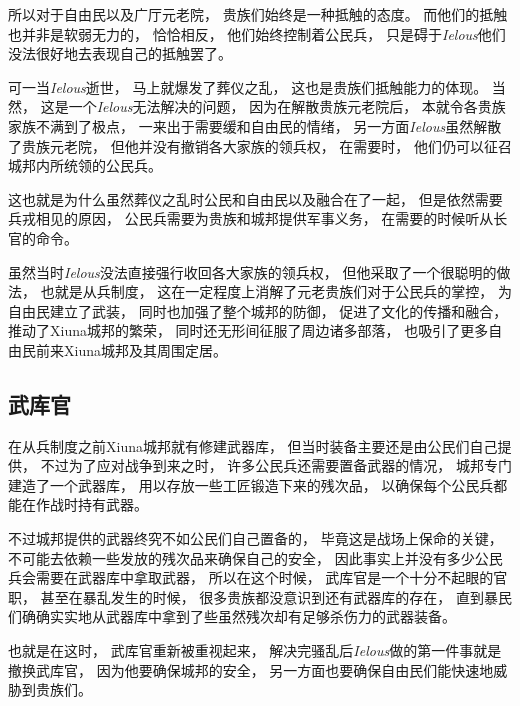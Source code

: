 \documentclass[12pt, a4paper]{ctexart}
\begin{document}
        所以对于自由民以及广厅元老院，
        贵族们始终是一种抵触的态度。
        而他们的抵触也并非是软弱无力的，
        恰恰相反，
        他们始终控制着公民兵，
        只是碍于\emph{Ielous}他们没法很好地去表现自己的抵触罢了。

        可一当\emph{Ielous}逝世，
        马上就爆发了葬仪之乱，
        这也是贵族们抵触能力的体现。
        当然，
        这是一个\emph{Ielous}无法解决的问题，
        因为在解散贵族元老院后，
        本就令各贵族家族不满到了极点，
        一来出于需要缓和自由民的情绪，
        另一方面\emph{Ielous}虽然解散了贵族元老院，
        但他并没有撤销各大家族的领兵权，
        在需要时，
        他们仍可以征召城邦内所统领的公民兵。

        这也就是为什么虽然葬仪之乱时公民和自由民以及融合在了一起，
        但是依然需要兵戎相见的原因，
        公民兵需要为贵族和城邦提供军事义务，
        在需要的时候听从长官的命令。

        虽然当时\emph{Ielous}没法直接强行收回各大家族的领兵权，
        但他采取了一个很聪明的做法，
        也就是从兵制度，
        这在一定程度上消解了元老贵族们对于公民兵的掌控，
        为自由民建立了武装，
        同时也加强了整个城邦的防御，
        促进了文化的传播和融合，
        推动了Xiuna城邦的繁荣，
        同时还无形间征服了周边诸多部落，
        也吸引了更多自由民前来Xiuna城邦及其周围定居。
    \subsection{武库官}
        在从兵制度之前Xiuna城邦就有修建武器库，
        但当时装备主要还是由公民们自己提供，
        不过为了应对战争到来之时，
        许多公民兵还需要置备武器的情况，
        城邦专门建造了一个武器库，
        用以存放一些工匠锻造下来的残次品，
        以确保每个公民兵都能在作战时持有武器。

        不过城邦提供的武器终究不如公民们自己置备的，
        毕竟这是战场上保命的关键，
        不可能去依赖一些发放的残次品来确保自己的安全，
        因此事实上并没有多少公民兵会需要在武器库中拿取武器，
        所以在这个时候，
        武库官是一个十分不起眼的官职，
        甚至在暴乱发生的时候，
        很多贵族都没意识到还有武器库的存在，
        直到暴民们确确实实地从武器库中拿到了些虽然残次却有足够杀伤力的武器装备。

        也就是在这时，
        武库官重新被重视起来，
        解决完骚乱后\emph{Ielous}做的第一件事就是撤换武库官，
        因为他要确保城邦的安全，
        另一方面也要确保自由民们能快速地威胁到贵族们。
\end{document}
